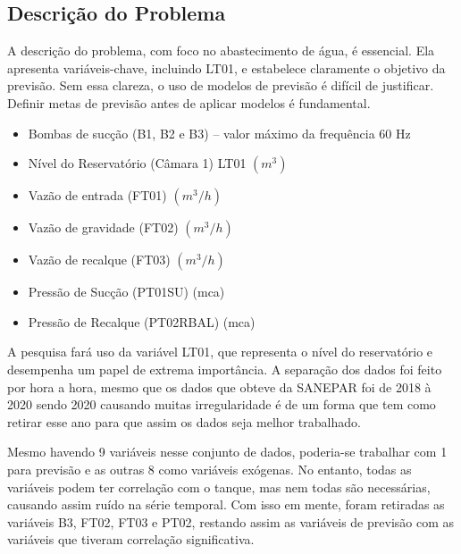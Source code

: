 \subsection{Descri\c c\~ao do Problema} \label{subsec:descricao}
A descrição do problema, com foco no abastecimento de água, é essencial. Ela apresenta variáveis-chave, incluindo LT01, e estabelece claramente o objetivo da previsão. Sem essa clareza, o uso de modelos de previsão é difícil de justificar. Definir metas de previsão antes de aplicar modelos é fundamental.


\begin{itemize}
	\item Bombas de sucção (B1, B2 e B3) – valor máximo da frequência $60$ Hz
	
	\item Nível do Reservatório (Câmara 1) LT01 $ (m^3) $ 
	
	\item Vazão de entrada (FT01) $ (m^3/h) $
	
	\item Vazão de gravidade (FT02) $ (m^3/h) $
	
	\item Vazão de recalque (FT03) $ (m^3/h) $
	
	\item Pressão de Sucção (PT01SU) (mca)
	
	\item Pressão de Recalque (PT02RBAL) (mca)
\end{itemize}

A pesquisa fará uso da variável LT01, que representa o nível do reservatório e desempenha um papel de extrema importância.
A separação dos dados foi feito por hora a hora, mesmo que os dados que obteve da SANEPAR foi de 2018 à 2020 sendo 2020 causando muitas irregularidade é de um forma que tem como retirar esse ano para que assim os dados seja melhor trabalhado. 

Mesmo havendo 9 variáveis nesse conjunto de dados, poderia-se trabalhar com 1 para previsão e as outras 8 como variáveis exógenas. No entanto, todas as variáveis podem ter correlação com o tanque, mas nem todas são necessárias, causando assim ruído na série temporal. Com isso em mente, foram retiradas as variáveis B3, FT02, FT03 e PT02, restando assim as variáveis de previsão com as variáveis que tiveram correlação significativa.